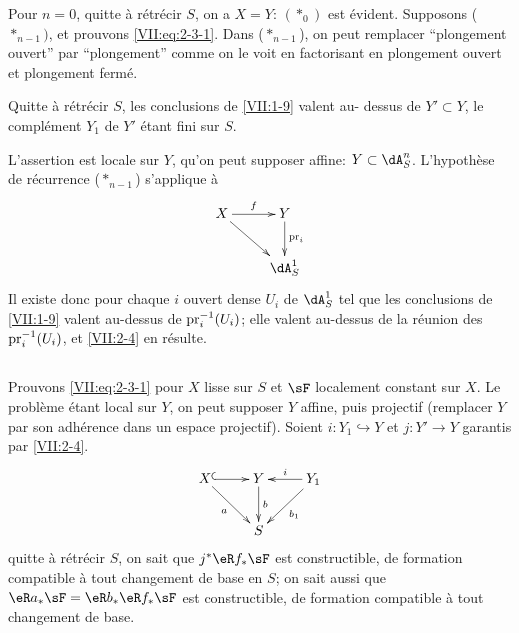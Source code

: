 Pour $n=0$, quitte \`a r\'etr\'ecir $S$, on a $X=Y$: $(\ast_0)$ est \'evident. 
Supposons ($\ast_{n-1})$, et prouvons \eqref{VII:eq:2-3-1}. Dans 
($\ast_{n-1}$), on peut remplacer ``plongement ouvert'' par ``plongement'' 
comme on le voit en factorisant en plongement ouvert et plongement ferm\'e. 





\begin{lemma_}\label{VII:2-4}
Quitte \`a r\'etr\'ecir $S$, les conclusions de \ref{VII:1-9} valent au-
dessus de $Y'\subset Y$, le compl\'ement $Y_1$ de $Y'$ \'etant fini sur $S$. 
\end{lemma_}

L'assertion est locale sur $Y$, qu'on peut supposer affine: $Y\subset \dA_S^n$. 
L'hypoth\`ese de r\'ecurrence ($\ast_{n-1}$) s'applique \`a 
\[\xymatrix{
  X \ar[r]^-f \ar[dr] 
    & Y \ar[d]^-{\pr_i} \\
  & \dA_S^1 
}\]
Il existe donc pour chaque $i$ ouvert dense $U_i$ de $\dA_S^1$ tel que les 
conclusions de \ref{VII:1-9} valent au-dessus de $\mathrm{pr}_i^{-1}(U_i)$; elle valent 
au-dessus de la r\'eunion des $\mathrm{pr}_i^{-1}(U_i)$, et \ref{VII:2-4} en r\'esulte. 





\addtocounter{subsection}{1} %
\subsection{}\label{VII:2-6}

Prouvons \eqref{VII:eq:2-3-1} pour $X$ lisse sur $S$ et $\sF$ localement 
constant sur $X$. Le probl\`eme \'etant local sur $Y$, on peut supposer $Y$ 
affine, puis projectif (remplacer $Y$ par son adh\'erence dans un espace 
projectif). Soient $i:Y_1\hookrightarrow Y$ et $j:Y' \to Y$ garantis par 
\ref{VII:2-4}. 
\[\xymatrix{
  X \ar@{^{(}->}[r] \ar[dr]_-a 
    & Y \ar[d]^-b 
    & \ar[l]_-i \ar[dl]^-{b_1} Y_1 \\
  & S 
}\] 
quitte \`a r\'etr\'ecir $S$, on sait que $j^\ast \eR f_\ast \sF$ est 
constructible, de formation compatible \`a tout changement de base en $S$; on 
sait aussi que $\eR a_\ast \sF = \eR b_\ast \eR f_\ast \sF$ est constructible, 
de formation compatible \`a tout changement de base. 

